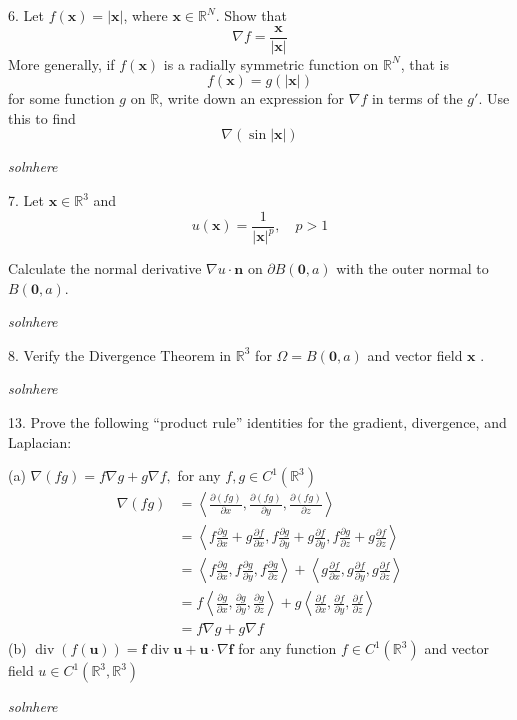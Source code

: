 \documentclass{article}
\begin{document}
6. Let $f(\mathbf{x}) = |\mathbf{x}|$, where $\mathbf{x} \in \mathbb{R}^{N}$.
Show that $$\nabla f = \frac{\mathbf{x}}{|\mathbf{x}|}$$ More generally,
if $f(\mathbf{x})$ is a radially symmetric function on $\mathbb{R}^{N}$,
that is $$f(\mathbf{x}) = g(|\mathbf{x}|)$$ for some function $g$ on
$\mathbb{R}$, write down an expression for $\nabla f$ in terms of the $g'$.
Use this to find $$\nabla(\sin |\mathbf{x}|)$$

\quad \textit{solnhere}

7. Let $\mathbf{x} \in \mathbb{R}^{3}$ and
$$u(\mathbf{x}) = \frac{1}{|\mathbf{x}|^{p}}, \quad p>1$$

Calculate the normal derivative $\nabla u \cdot \mathbf{n}$ on $\partial
B(\mathbf{0}, a)$ with the outer normal to $B(\mathbf{0}, a)$.

\quad \textit{solnhere}

8. Verify the Divergence Theorem in $\mathbb{R}^{3}$ for
$\Omega = B(\mathbf{0}, a)$ and vector field $\mathbf{x}$ .

\quad \textit{solnhere}

13. Prove the following ``product rule'' identities for the gradient,
divergence, and Laplacian:

(a) $\nabla(f g) = f \nabla g + g \nabla f,$ for any
$f, g \in C^{1}\left(\mathbb{R}^{3}\right)$
%
\begin{align*}
    \nabla (f g)
        &= \left\langle
                \frac{\partial (f g)}{\partial x},
                \frac{\partial (f g)}{\partial y},
                \frac{\partial (f g)}{\partial z}
           \right\rangle \\
        &= \left\langle
                f \frac{\partial g}{\partial x} + g \frac{\partial f}{\partial x},
                f \frac{\partial g}{\partial y} + g \frac{\partial f}{\partial y},
                f \frac{\partial g}{\partial z} + g \frac{\partial f}{\partial z}
           \right\rangle \\
        &= \left\langle
                f \frac{\partial g}{\partial x},
                f \frac{\partial g}{\partial y},
                f \frac{\partial g}{\partial z}
           \right\rangle
           +
           \left\langle
                g \frac{\partial f}{\partial x},
                g \frac{\partial f}{\partial y},
                g \frac{\partial f}{\partial z}
           \right\rangle \\
        &= f \left\langle
                \frac{\partial g}{\partial x},
                \frac{\partial g}{\partial y},
                \frac{\partial g}{\partial z}
           \right\rangle
           +
           g \left\langle
                \frac{\partial f}{\partial x},
                \frac{\partial f}{\partial y},
                \frac{\partial f}{\partial z}
           \right\rangle \\
        &= f \nabla g + g \nabla f
\end{align*}
%
(b) $\operatorname{div}(f (\mathbf{u})) = \mathbf{f} \operatorname{div} \mathbf{u} + \mathbf{u} \cdot \nabla \mathbf{f}$
for any function $f \in C^{1}\left(\mathbb{R}^{3}\right)$ and vector field
$u \in C^{1}\left(\mathbb{R}^{3}, \mathbb{R}^{3}\right)$

\quad \textit{solnhere}
\end{document}
